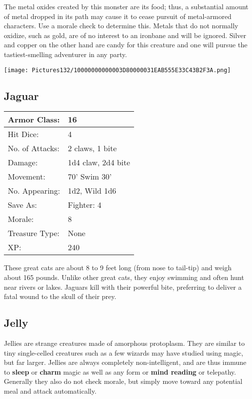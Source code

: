 \documentclass[a4paper,twoside,openany,10pt]{book}
\begin{document}
\begin{multicols}{2}
The metal oxides created by this monster are its food; thus, a substantial amount of metal dropped in its path may cause it to cease pursuit of metal-armored characters. Use a morale check to determine this.  Metals that do not normally oxidize, such as gold, are of no interest to an ironbane and will be ignored. Silver and copper on the other hand are candy for this creature and one will pursue the tastiest-smelling adventurer in any party.


\begin{center}
	\texttt{[image: Pictures132/10000000000003D80000031EAB555E33C43B2F3A.png]}
\end{center}


\subsection*{Jaguar}\label{jaguar}

\begin{tabularx}{0.50\textwidth}{@{}lX@{}}
Armor Class: & 16 \\\hline
Hit Dice: & 4 \\\hline
No. of Attacks: & 2 claws, 1 bite \\\hline
Damage: & 1d4 claw, 2d4 bite \\\hline
Movement: & 70' Swim 30' \\\hline
No. Appearing: & 1d2, Wild 1d6 \\\hline
Save As: & Fighter: 4 \\\hline
Morale: & 8 \\\hline
Treasure Type: & None \\\hline
XP: & 240 \\\hline
\end{tabularx}\medskip

These great cats are about 8 to 9 feet long (from nose to tail-tip) and weigh about 165 pounds. Unlike other great cats, they enjoy swimming and often hunt near rivers or lakes. Jaguars kill with their powerful bite, preferring to deliver a fatal wound to the skull of their prey. 

\subsection*{Jelly}\label{jelly}

Jellies are strange creatures made of amorphous protoplasm. They are similar to tiny single-celled creatures such as a few wizards may have studied using magic, but far larger. Jellies are always completely non-intelligent, and are thus immune to \textbf{sleep }or \textbf{charm }magic as well as any form or \textbf{mind reading }or telepathy. Generally they also do not check morale, but simply move toward any potential meal and attack automatically.


\end{multicols}
\end{document}
